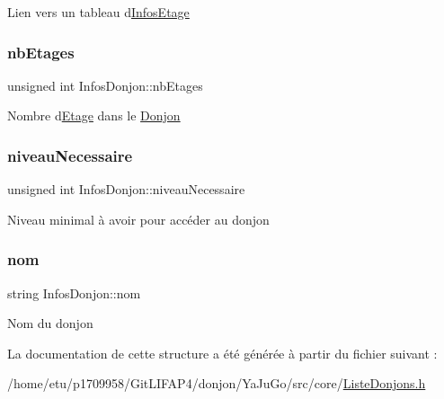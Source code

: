 Lien vers un tableau d\textquotesingle{}\mbox{\hyperlink{structInfosEtage}{Infos\+Etage}} \mbox{\label{structInfosDonjon_a19821da1e65faf7374033b20e9d65170}} 
\subsubsection{\texorpdfstring{nb\+Etages}{nbEtages}}
{\footnotesize\ttfamily unsigned int Infos\+Donjon\+::nb\+Etages}

Nombre d\textquotesingle{}\mbox{\hyperlink{classEtage}{Etage}} dans le \mbox{\hyperlink{classDonjon}{Donjon}} \mbox{\label{structInfosDonjon_a706c7d2087a2953bf35805fd76ade537}} 
\subsubsection{\texorpdfstring{niveau\+Necessaire}{niveauNecessaire}}
{\footnotesize\ttfamily unsigned int Infos\+Donjon\+::niveau\+Necessaire}

Niveau minimal à avoir pour accéder au donjon \mbox{\label{structInfosDonjon_a3ea4290a0982ad105087f446d3472b28}} 
\subsubsection{\texorpdfstring{nom}{nom}}
{\footnotesize\ttfamily string Infos\+Donjon\+::nom}

Nom du donjon 

La documentation de cette structure a été générée à partir du fichier suivant \+:\begin{DoxyCompactItemize}
\item 
/home/etu/p1709958/\+Git\+L\+I\+F\+A\+P4/donjon/\+Ya\+Ju\+Go/src/core/\mbox{\hyperlink{ListeDonjons_8h}{Liste\+Donjons.\+h}}\end{DoxyCompactItemize}
